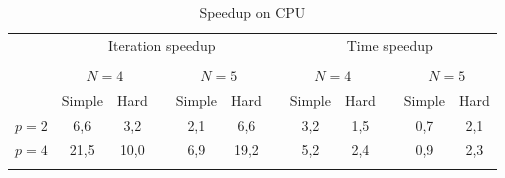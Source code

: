 \documentclass{svproc}
\begin{document}
\begin{table}
                \caption{Speedup on CPU}
                \label{table:average_MMAS_CPU}
                \center
                \begin{tabular}{lccccccccccc}
																	 & \multicolumn{5}{c}{ Iteration speedup} & & \multicolumn{5}{c}{ Time speedup}\\
                               \noalign{\smallskip} \cline{2-6} \cline{8-12}  \\
                                   & \multicolumn{2}{c}{ $N=4$ } & & \multicolumn{2}{c}{$N=5$} &  & \multicolumn{2}{c}{ $N=4$ } & & \multicolumn{2}{c}{$N=5$} \\
                               \noalign{\smallskip} \cline{2-3} \cline{5-6}  \cline{8-9} \cline{11-12} \noalign{\smallskip}
                               & Simple & Hard & & Simple & Hard &  & Simple & Hard & & Simple & Hard  \\
                               \noalign{\smallskip} \hline \noalign{\smallskip}                               
                               $p=2$&    6,6  & 3,2   &   & 2,1  & 6,6  &   & 3,2 & 1,5 &   & 0,7 & 2,1 \\
                               $p=4$&    21,5 &  10,0 &   & 6,9  & 19,2 &   & 5,2 & 2,4 &   & 0,9 & 2,3 \\
                               \noalign{\smallskip}\hline
                \end{tabular}
\end{table}

   
   
\end{document}
